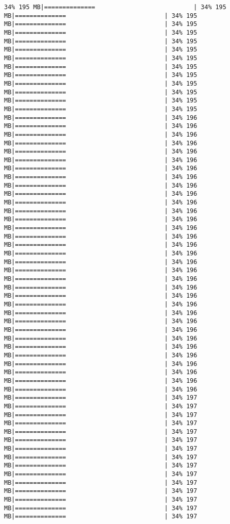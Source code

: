 \documentclass[
]{article}
\begin{document}
\begin{verbatim}
34% 195 MB|==============                           | 34% 195 MB|==============                           | 34% 195 MB|==============                           | 34% 195 MB|==============                           | 34% 195 MB|==============                           | 34% 195 MB|==============                           | 34% 195 MB|==============                           | 34% 195 MB|==============                           | 34% 195 MB|==============                           | 34% 195 MB|==============                           | 34% 195 MB|==============                           | 34% 195 MB|==============                           | 34% 195 MB|==============                           | 34% 195 MB|==============                           | 34% 196 MB|==============                           | 34% 196 MB|==============                           | 34% 196 MB|==============                           | 34% 196 MB|==============                           | 34% 196 MB|==============                           | 34% 196 MB|==============                           | 34% 196 MB|==============                           | 34% 196 MB|==============                           | 34% 196 MB|==============                           | 34% 196 MB|==============                           | 34% 196 MB|==============                           | 34% 196 MB|==============                           | 34% 196 MB|==============                           | 34% 196 MB|==============                           | 34% 196 MB|==============                           | 34% 196 MB|==============                           | 34% 196 MB|==============                           | 34% 196 MB|==============                           | 34% 196 MB|==============                           | 34% 196 MB|==============                           | 34% 196 MB|==============                           | 34% 196 MB|==============                           | 34% 196 MB|==============                           | 34% 196 MB|==============                           | 34% 196 MB|==============                           | 34% 196 MB|==============                           | 34% 196 MB|==============                           | 34% 196 MB|==============                           | 34% 196 MB|==============                           | 34% 196 MB|==============                           | 34% 196 MB|==============                           | 34% 196 MB|==============                           | 34% 196 MB|==============                           | 34% 197 MB|==============                           | 34% 197 MB|==============                           | 34% 197 MB|==============                           | 34% 197 MB|==============                           | 34% 197 MB|==============                           | 34% 197 MB|==============                           | 34% 197 MB|==============                           | 34% 197 MB|==============                           | 34% 197 MB|==============                           | 34% 197 MB|==============                           | 34% 197 MB|==============                           | 34% 197 MB|==============                           | 34% 197 MB|==============                           | 34% 197 MB|==============                           | 34% 197 
\end{verbatim}
\end{document}
